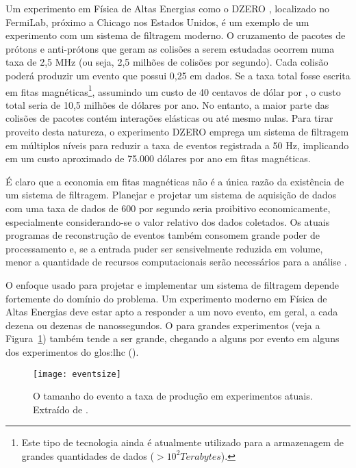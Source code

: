 Um experimento em Física de Altas Energias como o DZERO \cite{d0}, localizado
no FermiLab, próximo a Chicago nos Estados Unidos, é um exemplo de um
experimento com um sistema de filtragem moderno. O cruzamento de pacotes de
prótons e anti-prótons que geram as colisões a serem estudadas ocorrem numa
taxa de 2,5 MHz (ou seja, 2,5 milhões de colisões por segundo). Cada colisão
poderá produzir um evento que possui 0,25  em dados. Se a taxa
total fosse escrita em fitas magnéticas\footnote{Este tipo de tecnologia ainda
é atualmente utilizado para a armazenagem de grandes quantidades de dados ($>
10^{2} Terabytes$).}, assumindo um custo de 40 centavos de dólar por
, o custo total seria de 10,5 milhões de dólares por ano. No 
entanto, a maior parte das colisões de pacotes contém interações elásticas ou
até mesmo nulas. Para tirar proveito desta natureza, o experimento DZERO
emprega um sistema de filtragem em múltiplos níveis para reduzir a taxa de
eventos registrada a 50 Hz, implicando em um custo aproximado de 75.000
dólares por ano em fitas magnéticas.

É claro que a economia em fitas magnéticas não é a única razão da existência
de um sistema de filtragem. Planejar e projetar um sistema de aquisição de
dados com uma taxa de dados de 600  por segundo seria
proibitivo economicamente, especialmente considerando-se o valor relativo dos
dados coletados. Os atuais programas de reconstrução de eventos também
consomem grande poder de processamento e, se a entrada puder ser sensivelmente
reduzida em volume, menor a quantidade de recursos computacionais serão
necessários para a análise .

O enfoque usado para projetar e implementar um sistema de filtragem depende
fortemente do domínio do problema. Um experimento moderno em Física de Altas
Energias deve estar apto a responder a um novo evento, em geral, a cada
dezena ou dezenas de nanossegundos. O  para grandes
experimentos (veja a Figura~\ref{fig:eventsize}) também tende a ser grande,
chegando a alguns  por evento em alguns dos experimentos do
\gls{glos:lhc} ().

\begin{figure}
\begin{center}
\texttt{[image: eventsize]}
\end{center}
\caption{O tamanho do evento  a taxa de produção em experimentos
atuais. Extraído de \cite{trig-review}.}
\label{fig:eventsize}
\end{figure}

